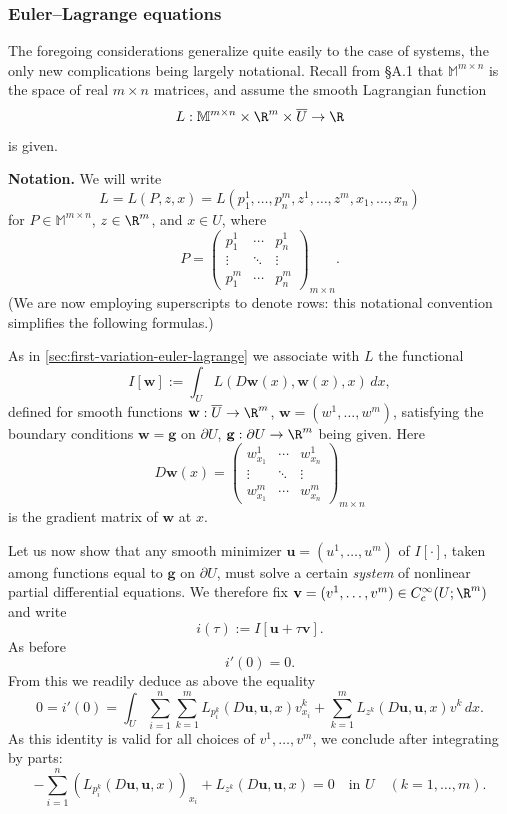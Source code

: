 \subsubsection{Euler--Lagrange equations}

The foregoing considerations generalize quite easily to the case of systems, the only new complications being largely notational. Recall from \S A.1 that $\mathbb{M}^{m \times n}$ is the space of real $m \times n$ matrices, and assume the smooth Lagrangian function
\[
L: \mathbb{M}^{m \times n} \times \R^m \times \overline{U} \to \R
\]
is given.

\noindent\textbf{Notation.} We will write
\[
L = L(P, z, x) = L(p_1^1, \ldots, p_n^m, z^1, \ldots, z^m, x_1, \ldots, x_n)
\]
for $P \in \mathbb{M}^{m \times n}$, $z \in \R^m$, and $x \in U$, where
\[
P = \begin{pmatrix} p_1^1 & \cdots & p_n^1 \\ \vdots & \ddots & \vdots \\ p_1^m & \cdots & p_n^m \end{pmatrix}_{m \times n}.
\]
(We are now employing superscripts to denote rows: this notational convention simplifies the following formulas.)

As in \cref{sec:first-variation-euler-lagrange} we associate with $L$ the functional
\[
I[\mathbf{w}] := \int_U L(D\mathbf{w}(x), \mathbf{w}(x), x)\, dx,
\tag{15}
\]
defined for smooth functions $\mathbf{w}: \overline{U} \to \R^m$, $\mathbf{w} = (w^1, \ldots, w^m)$, satisfying the boundary conditions $\mathbf{w} = \mathbf{g}$ on $\partial U$, $\mathbf{g}: \partial U \to \R^m$ being given. Here
\[
D\mathbf{w}(x) = \begin{pmatrix} w^1_{x_1} & \cdots & w^1_{x_n} \\ \vdots & \ddots & \vdots \\ w^m_{x_1} & \cdots & w^m_{x_n} \end{pmatrix}_{m \times n}
\]
is the gradient matrix of $\mathbf{w}$ at $x$.

Let us now show that any smooth minimizer $\mathbf{u} = (u^1, \ldots, u^m)$ of $I[\cdot]$, taken among functions equal to $\mathbf{g}$ on $\partial U$, must solve a certain \textit{system} of nonlinear partial differential equations. We therefore fix $\mathbf{v} = (v^1, \ldots, v^m) \in C_c^\infty(U; \R^m)$ and write
\[
i(\tau) := I[\mathbf{u} + \tau \mathbf{v}].
\]
As before
\[
i'(0) = 0.
\]
From this we readily deduce as above the equality
\[
0 = i'(0) = \int_U \sum_{i=1}^n \sum_{k=1}^m L_{p_i^k}(D\mathbf{u}, \mathbf{u}, x) v^k_{x_i} + \sum_{k=1}^m L_{z^k}(D\mathbf{u}, \mathbf{u}, x) v^k \, dx.
\]
As this identity is valid for all choices of $v^1, \ldots, v^m$, we conclude after integrating by parts:
\[
-\sum_{i=1}^n \left( L_{p_i^k}(D\mathbf{u}, \mathbf{u}, x) \right)_{x_i} + L_{z^k}(D\mathbf{u}, \mathbf{u}, x) = 0 \quad \text{in } U \quad (k = 1, \ldots, m).
\tag{16}
\]

